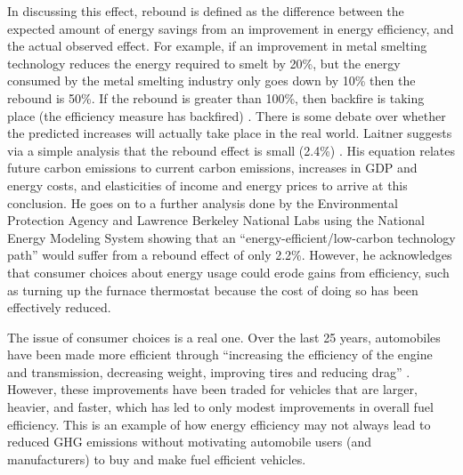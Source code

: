 In discussing this effect, rebound is defined as the difference between the expected amount of energy savings from an improvement in energy efficiency, and the actual observed effect. For example, if an improvement in metal smelting technology reduces the energy required to smelt by 20\%, but the energy consumed by the metal smelting industry only goes down by 10\% then the rebound is 50\%. If the rebound is greater than 100\%, then backfire is taking place (the efficiency measure has backfired) \cite{Hanley2008Do-increases-in}. There is some debate over whether the predicted increases will actually take place in the real world. Laitner suggests via a simple analysis that the rebound effect is small (2.4\%) \cite{Skip-Laitner:2000yg}. His equation relates future carbon emissions to current carbon emissions, increases in GDP and energy costs, and elasticities of income and energy prices to arrive at this conclusion. He goes on to a further analysis done by the Environmental Protection Agency and Lawrence Berkeley National Labs using the National Energy Modeling System showing that an ``energy-efficient/low-carbon technology path'' would suffer from a rebound effect of only 2.2\%. However, he acknowledges that consumer choices about energy usage could erode gains from efficiency, such as turning up the furnace thermostat because the cost of doing so has been effectively reduced.

The issue of consumer choices is a real one. Over the last 25 years, automobiles have been made more efficient through ``increasing the efficiency of the engine and transmission, decreasing weight, improving tires and reducing drag'' \cite{Heywood2008Fueling-Our-Future}. However, these improvements have been traded for vehicles that are larger, heavier, and faster, which has led to only modest improvements in overall fuel efficiency. This is an example of how energy efficiency may not always lead to reduced GHG emissions without motivating automobile users (and manufacturers) to buy and make fuel efficient vehicles.

